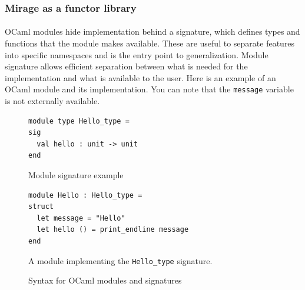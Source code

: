 \documentclass[a4paper]{article}
\begin{document}
\subsubsection{Mirage as a functor library}
\paragraph{}
OCaml modules hide implementation behind a signature, which defines types and functions that the module 
makes available. These are useful to separate features into specific namespaces and is the entry point 
to generalization. Module signature allows efficient separation between what is needed for the implementation 
and what is available to the user. Here is an example of an OCaml module and its implementation. 
You can note that the \texttt{message} variable is not externally available.

\begin{figure}[!h]
 \begin{minipage}{0.5\textwidth}
  \centering
  \begin{verbatim}
module type Hello_type =
sig
  val hello : unit -> unit
end
  \end{verbatim}
  \caption*{Module signature example}
 \end{minipage}
 \begin{minipage}{0.5\textwidth}
  \centering
  \begin{verbatim}
module Hello : Hello_type =
struct
  let message = "Hello"
  let hello () = print_endline message
end
  \end{verbatim}
  \caption*{A module implementing the \texttt{Hello\_type} signature.}
 \end{minipage}
 \caption{Syntax for OCaml modules and signatures}
\end{figure}
\end{document}
